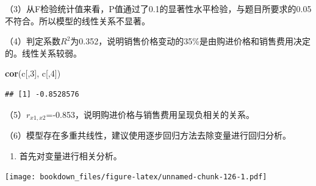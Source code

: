 \documentclass[]{ctexbook}
\newenvironment{Shaded}{\begin{snugshade}}{\end{snugshade}}
\newcommand{\DataTypeTok}[1]{\textcolor[rgb]{0.13,0.29,0.53}{#1}}
\newcommand{\DecValTok}[1]{\textcolor[rgb]{0.00,0.00,0.81}{#1}}
\newcommand{\FloatTok}[1]{\textcolor[rgb]{0.00,0.00,0.81}{#1}}
\newcommand{\KeywordTok}[1]{\textcolor[rgb]{0.13,0.29,0.53}{\textbf{#1}}}
\newcommand{\NormalTok}[1]{#1}
\newcommand{\OperatorTok}[1]{\textcolor[rgb]{0.81,0.36,0.00}{\textbf{#1}}}
\newcommand{\StringTok}[1]{\textcolor[rgb]{0.31,0.60,0.02}{#1}}
\providecommand{\tightlist}{%
  \setlength{\itemsep}{0pt}\setlength{\parskip}{0pt}}
\begin{document}
（3）从F检验统计值来看，P值通过了0.1的显著性水平检验，与题目所要求的0.05不符合。所以模型的线性关系不显著。

（4）判定系数\(R^2\)为0.352，说明销售价格变动的35\%是由购进价格和销售费用决定的。线性关系较弱。

\begin{Shaded}
\begin{Highlighting}[]
\KeywordTok{cor}\NormalTok{(c[,}\DecValTok{3}\NormalTok{], c[,}\DecValTok{4}\NormalTok{])}
\end{Highlighting}
\end{Shaded}

\begin{verbatim}
## [1] -0.8528576
\end{verbatim}

（5）\(r_{x1,x2}\)=-0.853，说明购进价格与销售费用呈现负相关的关系。

（6）模型存在多重共线性，建议使用逐步回归方法去除变量进行回归分析。

\begin{enumerate}
\def\labelenumi{\arabic{enumi}.}
\setcounter{enumi}{3}
\tightlist
\item
  首先对变量进行相关分析。
\end{enumerate}

\begin{Shaded}
\end{Shaded}

\texttt{[image: bookdown\_files/figure-latex/unnamed-chunk-126-1.pdf]}
\end{document}
